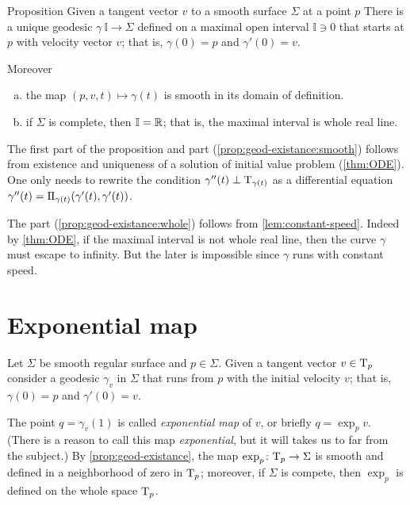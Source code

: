 \begin{thm}{Proposition}\label{prop:geod-existance} 
Given a tangent vector $v$ to a smooth surface $\Sigma$ at a point $p$
There is a unique geodesic $\gamma\:\mathbb{I}\to \Sigma$ defined on a maximal open interval $\mathbb{I}\ni 0$ that starts at $p$ with velocity vector $v$;
that is, $\gamma(0)=p$ and $\gamma'(0)=v$.

Moreover
\begin{enumerate}[(a)]
\item\label{prop:geod-existance:smooth} the map $(p,v,t)\mapsto \gamma(t)$ is smooth in its domain of definition.
\item\label{prop:geod-existance:whole} if $\Sigma$ is complete, then $\mathbb{I}=\mathbb{R}$; that is, the maximal interval is whole real line.
\end{enumerate}

\end{thm}

The first part of the proposition and part (\ref{prop:geod-existance:smooth}) follows from existence and uniqueness of a solution of initial value problem (\ref{thm:ODE}).
One only needs to rewrite the condition $\gamma''(t)\perp\mathrm{T}_{\gamma(t)}$ as a differential equation 
$\gamma''(t)=\mathrm{I}\hskip-.02em\mathrm{I}_{\gamma(t)}(\gamma'(t),\gamma'(t))$.

The part (\ref{prop:geod-existance:whole}) follows from \ref{lem:constant-speed}.
Indeed by \ref{thm:ODE}, if the maximal interval is not whole real line, then the curve $\gamma$ must escape to infinity. %
But the later is impossible since $\gamma$ runs with constant speed.
\qeds

\section*{Exponential map}

Let $\Sigma$ be smooth regular surface and $p\in \Sigma$.
Given a tangent vector $v\in \mathrm{T}_p$ consider a geodesic $\gamma_v$ in $\Sigma$ that runs from $p$ with the initial velocity $v$;  
that is, $\gamma(0)=p$ and $\gamma'(0)=v$.

The point $q=\gamma_v(1)$ is called \emph{exponential map} of $v$, or briefly $q=\exp_pv$.
(There is a reason to call this map \emph{exponential}, but it will takes us to far from the subject.)
By \ref{prop:geod-existance}, the map $\exp_p\colon\mathrm{T}_p\to \Sigma$ is smooth and defined in a neighborhood of zero in $\mathrm{T}_p$;
moreover, if $\Sigma$ is compete, then $\exp_p$ is defined on the whole space $\mathrm{T}_p$.

